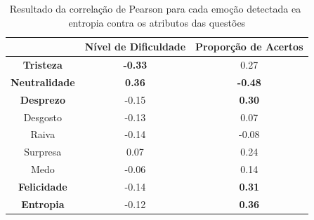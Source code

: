 \begin{table}[]\footnotesize
\centering
\caption{Resultado​ ​da​ ​correla\c{c}\~ao​ ​de​ ​Pearson​ ​para​ ​cada​ ​emo\c{c}\~ao​ ​detectada
e​ ​a​ ​entropia​ ​contra​ ​os​ ​atributos​ ​das​ ​quest\~oes}
\label{tabelaArti}
\begin{tabular}{|c|c|c|}
\hline
                      & \textbf{Nível de Dificuldade} & \textbf{Proporção de Acertos} \\ \hline
\textbf{Tristeza}     & \textbf{-0.33}                & 0.27                          \\ \hline
\textbf{Neutralidade} & \textbf{0.36}                 & \textbf{-0.48}                \\ \hline
\textbf{Desprezo}     & -0.15                         & \textbf{0.30}                 \\ \hline
Desgosto              & -0.13                         & 0.07                          \\ \hline
Raiva                 & -0.14                         & -0.08                         \\ \hline
Surpresa              & 0.07                          & 0.24                          \\ \hline
Medo                  & -0.06                         & 0.14                          \\ \hline
\textbf{Felicidade}   & -0.14                         & \textbf{0.31}                 \\ \hline
\textbf{Entropia}     & -0.12                         & \textbf{0.36}                 \\ \hline
\end{tabular}
\end{table}




